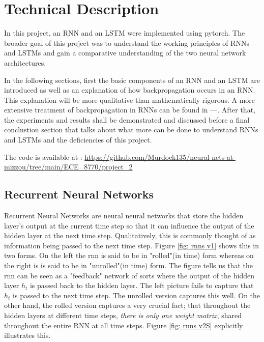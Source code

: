 \documentclass[12pt, letterpaper]{article}
\begin{document}

\tableofcontents

\section{Technical Description}

In this project, an RNN and an LSTM were implemented using pytorch.
The broader goal of this project was to understand the working principles of
RNNs and LSTMs and gain a comparative understanding of the two neural network
architectures. 

In the following sections, first the basic components of an RNN and an LSTM 
are introduced as well as an explanation of how backpropagation occurs in an 
RNN. This explanation will be more qualitative than mathematically rigorous. 
A more extensive treatment of backpropagation in RNNs can be found in ---. After that, the experiments and results shall be demonstrated and discussed before
a final conclustion section that talks about what more can be done to understand
RNNs and LSTMs and the deficiencies of this project.

The code is available at : \url{https://github.com/Murdock135/neural-nets-at-mizzou/tree/main/ECE_8770/project_2}

\subsection{Recurrent Neural Networks}

Recurrent Neural Networks are neural neural networks that store the 
hidden layer's output at the current time step so that it can influence
the output of the hidden layer at the next time step. Qualitatively,
this is commonly thought of as information being passed to the next time
step. Figure \ref{fig: rnns v1} shows this in two forms. On the left the 
rnn is said to be in "rolled"(in time) form whereas on the right is is said to be 
in "unrolled"(in time) form. The figure tells us that the rnn can be seen as a "feedback"
network of sorts where the output of the hidden layer $h_t$ is passed back to the hidden layer.
The left picture fails to capture that $h_t$ is passed to the next time step. The unrolled 
version captures this well. On the other hand, the rolled version captures a very crucial 
fact; that throughout the hidden layers at different time steps, \textit{there is only 
one weight matrix}, shared throughout the entire RNN at all time steps. Figure \ref{fig: rnns v2S} explicitly
illustrates this.
\end{document}
